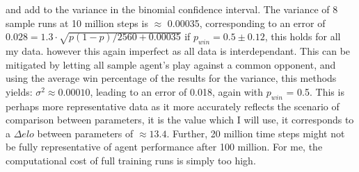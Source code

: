 \noindent
and add to the variance in the binomial confidence interval. The variance of 8 sample runs at 10 million steps is $\approx$ 0.00035, corresponding to an error of $0.028 = 1.3\cdot \sqrt{p(1-p)/2560 + 0.00035}$ if $p_{win} = 0.5 \pm 0.12$, this holds for all my data. however this again imperfect as all data is interdependant. This can be mitigated by letting all sample agent's play against a common opponent, and using the average win percentage of the results for the variance, this methods yields: $\sigma^2 \approx 0.00010$, leading to an error of 0.018, again with $p_{win}$ = 0.5. This is perhaps more representative data as it more accurately reflects the scenario of comparison between parameters, it is the value which I will use, it corresponds to a $\Delta elo$ between parameters of $\approx 13.4$. Further, 20 million time steps might not be fully representative of agent performance after 100 million. For me, the computational cost of full training runs is simply too high. 



\iffalse
\section{Training Process}
 Agent training for even a relatively simple problem such as this soccer simulation incurs immense computational and temporal cost, including initial testing, though much of this was in parallel, total training time during this thesis including initial testing was roughly 250 hours. Some of this was due to inefficiencies in my methodology, and perhaps poor code performance. As the training algorithm gets more complex and additional variables are introduced, this issue only worsens. 
 \\ Evaluation of training data is also quite difficult, especially in tasks where self play is involved. The elo rating system is a decent indicator of overall performance, but might not give the best parameter choice when testing.
 \fi



